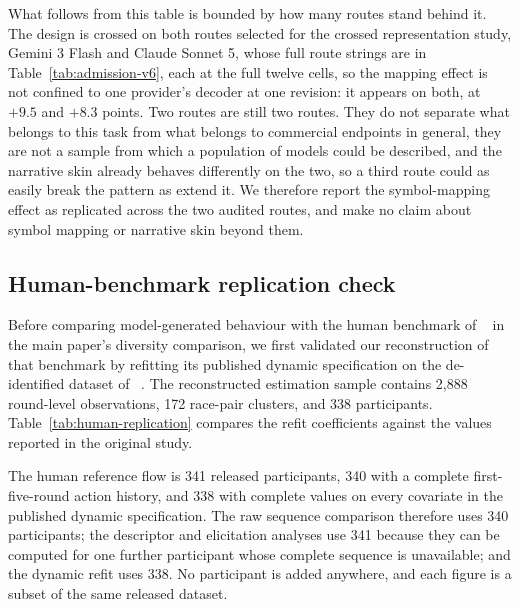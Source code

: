 \documentclass{article}
\DeclareRobustCommand{\citet}[1]{\citeauthor{#1}~\shortcite{#1}}
\begin{document}
What follows from this table is bounded by how many routes stand behind it.
The design is crossed on both routes selected for the crossed representation
study, Gemini 3 Flash and Claude
Sonnet 5, whose full route strings are in
Table~\ref{tab:admission-v6}, each at the full twelve cells, so
the mapping effect is not confined to one provider's decoder at one revision:
it appears on both, at $+9.5$ and $+8.3$ points. Two routes are still two
routes. They do not separate what belongs to this task from what belongs to
commercial endpoints in general, they are not a sample from which a population
of models could be described, and the narrative skin already behaves
differently on the two, so a third route could as easily break the pattern as
extend it. We therefore report the symbol-mapping effect as replicated across
the two audited routes, and make no claim about symbol mapping or narrative
skin beyond them.

\subsection{Human-benchmark replication check}
\label{app:human-benchmark-replication}

Before comparing model-generated behaviour with the human benchmark of
\citet{falling_behind_unsafe} in the main paper's diversity comparison, we first
validated our reconstruction of that benchmark by refitting its published
dynamic specification on the de-identified dataset of
\citet{falling_behind_unsafe}. The
reconstructed estimation sample contains 2{,}888 round-level observations,
172 race-pair clusters, and 338 participants. Table~\ref{tab:human-replication} compares the refit coefficients against the values reported in the
original study.

The human reference flow is 341 released participants, 340 with a complete
first-five-round action history, and 338 with complete values on every
covariate in the published dynamic specification. The raw sequence comparison
therefore uses 340 participants; the descriptor and elicitation analyses use
341 because they can be computed for one further participant whose complete
sequence is unavailable; and the dynamic refit uses 338. No participant is
added anywhere, and each figure is a subset of the same released dataset.
\end{document}
